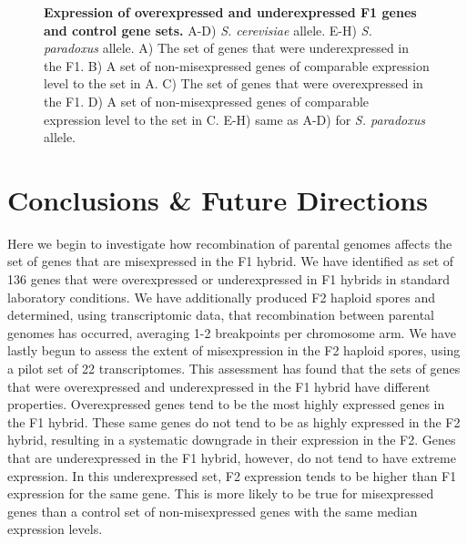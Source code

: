 \begin{figure}
    \centering
    \label{fig:hyc}
\end{figure}

\begin{figure}
    \centering
    \label{fig:hyp}
\end{figure}

\begin{figure}
    \centering
    \caption{\textbf{Expression of overexpressed and underexpressed F1 genes and control gene sets.}  A-D) \textit{S. cerevisiae} allele. E-H) \textit{S. paradoxus} allele. A) The set of genes that were underexpressed in the F1. B) A set of non-misexpressed genes of comparable expression level to the set in A. C) The set of genes that were overexpressed in the F1. D) A set of non-misexpressed genes of comparable expression level to the set in C. E-H) same as A-D) for \textit{S. paradoxus} allele.}
    \label{fig:capt}
\end{figure}

\section{Conclusions \& Future Directions}

Here we begin to investigate how recombination of parental genomes affects the set of genes that are misexpressed in the F1 hybrid. We have identified as set of 136 genes that were overexpressed or underexpressed in F1 hybrids in standard laboratory conditions. We have additionally produced F2 haploid spores and determined, using transcriptomic data, that recombination between parental genomes has occurred, averaging 1-2 breakpoints per chromosome arm. We have lastly begun to assess the extent of misexpression in the F2 haploid spores, using a pilot set of 22 transcriptomes. This assessment has found that the sets of genes that were overexpressed and underexpressed in the F1 hybrid have different properties. Overexpressed genes tend to be the most highly expressed genes in the F1 hybrid. These same genes do not tend to be as highly expressed in the F2 hybrid, resulting in a systematic downgrade in their expression in the F2. Genes that are underexpressed in the F1 hybrid, however, do not tend to have extreme expression. In this underexpressed set, F2 expression tends to be higher than F1 expression for the same gene. This is more likely to be true for misexpressed genes than a control set of non-misexpressed genes with the same median expression levels. 

